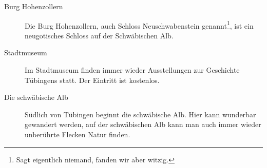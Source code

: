 \begin{description}
\item[Burg Hohenzollern]
Die Burg Hohenzollern, auch Schloss Neuschwabenstein genannt\footnote{Sagt eigentlich niemand, fanden wir aber witzig.}, ist ein neugotisches Schloss auf der Schwäbischen Alb.

\item[Stadtmuseum]
Im Stadtmuseum finden immer wieder Ausstellungen zur Geschichte Tübingens statt. Der Eintritt ist kostenlos. %

\item[Die schwäbische Alb]
Südlich von Tübingen beginnt die schwäbische Alb. Hier kann wunderbar gewandert werden, auf der schwäbischen Alb kann man auch immer wieder unberührte Flecken Natur finden.

\end{description}

